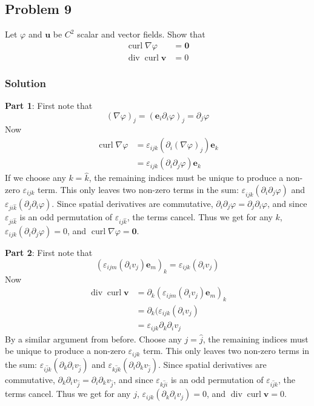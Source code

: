 \documentclass[letterpaper,10pt]{article}
\begin{document}
\subsection*{Problem 9}
Let $\varphi$ and $\mathbf{u}$ be $\mathit{C}^2$ scalar and vector fields. Show
that
\begin{align*}
\operatorname{curl} \nabla\varphi &= \mathbf{0}\\
\operatorname{div}\operatorname{curl}\mathbf{v}&=0
\end{align*}
\subsubsection*{Solution}
\textbf{Part 1}:\newline
First note that
\[
(\nabla\varphi)_j=(\mathbf{e}_i\partial_i\varphi)_j=\partial_j\varphi
\]
Now
\begin{align*}
\operatorname{curl}\nabla\varphi
&=\varepsilon_{ijk}(\partial_i(\nabla\varphi)_j)\mathbf{e}_k\\
&=\varepsilon_{ijk}(\partial_i\partial_j\varphi)\mathbf{e}_k
\end{align*}
If we choose any $k=\hat k$, the remaining indices must be unique to produce a
non-zero $\varepsilon_{ijk}$ term. This only leaves two non-zero terms in the
sum: $\varepsilon_{ij\hat k}(\partial_i\partial_j\varphi)$ and
$\varepsilon_{ji\hat k}(\partial_j\partial_i\varphi)$. Since spatial
derivatives are commutative,
$\partial_i\partial_j\varphi=\partial_j\partial_i\varphi$, and since
$\varepsilon_{ji\hat k}$ is an odd permutation of $\varepsilon_{ij\hat k}$, the
terms cancel. Thus we get for any
$k$, $\varepsilon_{ijk}(\partial_i\partial_j\varphi)=0$, and
$\operatorname{curl}\nabla\varphi=\mathbf{0}$.

\textbf{Part 2}:\newline
First note that
\[
(\varepsilon_{ijm}(\partial_i v_j)\mathbf{e}_m)_k
=\varepsilon_{ijk}(\partial_i v_j)
\]
Now
\begin{align*}
\operatorname{div}\operatorname{curl}\mathbf{v}
&=\partial_k(\varepsilon_{ijm}(\partial_i v_j)\mathbf{e}_m)_k\\
&=\partial_k(\varepsilon_{ijk}(\partial_i v_j)\\
&=\varepsilon_{ijk}\partial_k\partial_i v_j
\end{align*}
By a similar argument from before. Choose any $j=\hat j$, the remaining indices
must be unique to produce a non-zero $\varepsilon_{ijk}$ term. This only leaves
two non-zero terms in the sum:
$\varepsilon_{i\hat jk}(\partial_k\partial_i v_{\hat j})$ and
$\varepsilon_{k\hat jk}(\partial_i\partial_k v_{\hat j})$. Since spatial
derivatives are commutative,
$\partial_k\partial_i v_{\hat j}=\partial_i\partial_k v_{\hat j}$, and since
$\varepsilon_{k\hat ji}$ is an odd permutation of $\varepsilon_{i\hat jk}$, the
terms cancel. Thus we get for any
$j$, $\varepsilon_{ijk}(\partial_k\partial_i v_j)=0$, and
$\operatorname{div}\operatorname{curl}\mathbf{v}=0$.
\end{document}
